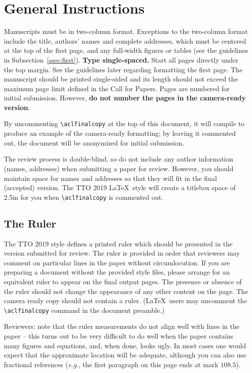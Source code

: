 \documentclass[11pt,a4paper]{article}
\begin{document}
\section{General Instructions}

Manuscripts must be in two-column format.  Exceptions to the
two-column format include the title, authors' names and complete
addresses, which must be centered at the top of the first page, and
any full-width figures or tables (see the guidelines in
Subsection~\ref{ssec:first}). \textbf{Type single-spaced.}  Start all
pages directly under the top margin. See the guidelines later
regarding formatting the first page.  The manuscript should be
printed single-sided and its length
should not exceed the maximum page limit defined in the Call for Papers.
Pages are numbered for  initial submission. However, \textbf{do not number the pages in the camera-ready version}.

By uncommenting {\small\verb|\aclfinalcopy|} at the top of this 
 document, it will compile to produce an example of the camera-ready formatting; by leaving it commented out, the document will be anonymized for initial submission.  

The review process is double-blind, so do not include any author information (names, addresses) when submitting a paper for review.  
However, you should maintain space for names and addresses so that they will fit in the final (accepted) version.  The TTO 2019 \LaTeX\ style will create a titlebox space of 2.5in for you when {\small\verb|\aclfinalcopy|} is commented out.  

\subsection{The Ruler}
The TTO 2019 style defines a printed ruler which should be presented in the
version submitted for review.  The ruler is provided in order that
reviewers may comment on particular lines in the paper without
circumlocution.  If you are preparing a document without the provided
style files, please arrange for an equivalent ruler to
appear on the final output pages.  The presence or absence of the ruler
should not change the appearance of any other content on the page.  The
camera ready copy should not contain a ruler. (\LaTeX\ users may uncomment the {\small\verb|\aclfinalcopy|} command in the document preamble.)  

Reviewers: note that the ruler measurements do not align well with
lines in the paper -- this turns out to be very difficult to do well
when the paper contains many figures and equations, and, when done,
looks ugly. In most cases one would expect that the approximate
location will be adequate, although you can also use fractional
references (\emph{e.g.}, the first paragraph on this page ends at mark $108.5$).
\end{document}

